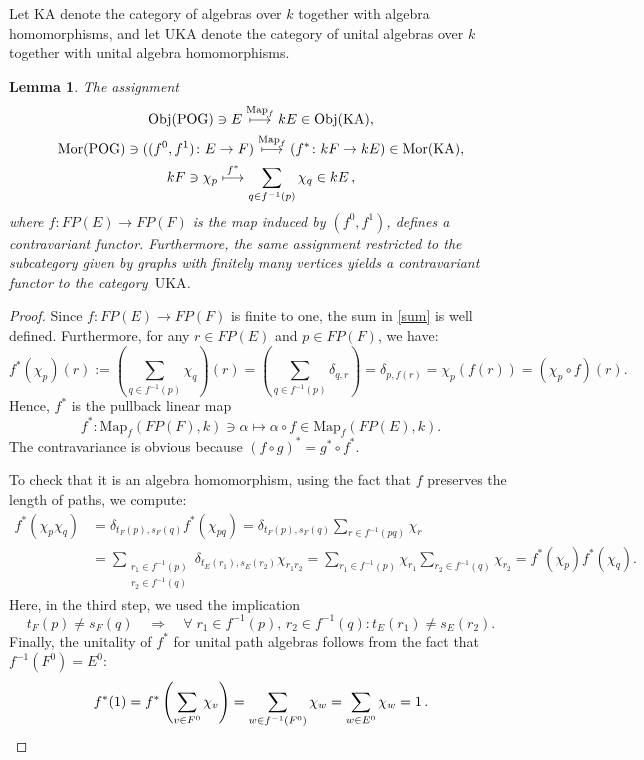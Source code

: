 \documentclass[12pt,times,a4paper]{amsart}
\newtheorem{lemma}[theorem]{Lemma}
\numberwithin{equation}{section}
\numberwithin{equation}{section}
\begin{document}
Let $\mathrm{KA}$ denote the category of algebras over $k$ together with algebra homomorphisms, 
and let $\mathrm{UKA}$ denote the category of unital 
algebras over $k$ together with unital algebra homomorphisms.
\begin{lemma}\label{contrafp}
The assignment
\begin{gather}
\mathrm{Obj}({\rm POG})\ni E\stackrel{\mathrm{Map}_f}{\longmapsto}kE\in\mathrm{Obj}(\mathrm{KA}),\nonumber\\
\mathrm{Mor}({\rm POG})\ni ((f^0,f^1)\colon E\to F)
\stackrel{\mathrm{Map}_f}{\longmapsto}(f^*\colon kF\to kE)\in\mathrm{Mor}(\mathrm{KA}),\nonumber\\
kF\ni \chi_p\stackrel{f^*}{\longmapsto}\sum_{q\in f^{-1}(p)}\chi_q\in kE\,,\label{sum}
\end{gather}
where $f\colon FP(E)\to FP(F)$ is the map induced by $(f^0,f^1)$, defines a contravariant functor. Furthermore, the same assignment 
restricted to the subcategory 
given by graphs with finitely many vertices yields a contravariant functor to the category~$\mathrm{UKA}$.
\end{lemma}
\begin{proof}
Since $f:FP(E)\to FP(F)$ is finite to one, the sum in \eqref{sum} is well defined.
 Furthermore, for any $r\in FP(E)$ and $p\in FP(F)$, we have:
\begin{equation}
f^*(\chi_p)(r):=\left(\sum_{q\in f^{-1}(p)}\chi_q\right) (r)=
\left(\sum_{q\in f^{-1}(p)}\delta_{q,r}\right)=\delta_{p,f(r)}=\chi_p(f(r))=
(\chi_p\circ f)(r).
\end{equation} 
Hence, $f^*$ is the pullback linear map
\begin{equation}
f^*\colon \mathrm{Map}_f(FP(F),k)\ni\alpha\longmapsto\alpha\circ f\in \mathrm{Map}_f(FP(E),k).
\end{equation}
The contravariance  is obvious because
$(f\circ g)^*=g^*\circ f^*$. 

To check that it is an algebra homomorphism, using the fact that $f$ preserves the length of paths,
 we compute:
\begin{align}
f^*(\chi_p\chi_q)&=\delta_{t_F(p),s_F(q)}f^*(\chi_{pq})=\delta_{t_F(p),s_F(q)}\sum_{r\in f^{-1}(pq)}\chi_r
\\
&=\sum_{\substack{r_1\in f^{-1}(p)\\ r_2\in f^{-1}(q)}}\delta_{t_E(r_1),s_E(r_2)}\chi_{r_1r_2}
=\sum_{r_1\in f^{-1}(p)}\chi_{r_1}\sum_{r_2\in f^{-1}(q)}\chi_{r_2}=f^*(\chi_p)f^*(\chi_q). \nonumber
\end{align}
Here, in the third step, we used the implication
\begin{equation}
t_F(p)\neq s_F(q)\quad\Longrightarrow\quad \forall\;r_1\in f^{-1}(p),\, r_2\in f^{-1}(q)\colon t_E(r_1)\neq
s_E(r_2).
\end{equation}
Finally, the unitality of $f^*$ for unital path algebras follows from the fact that $f^{-1}(F^0)=E^0$:
\begin{equation}
f^*(1)=f^*\left(\sum_{v\in F^0}\chi_v\right)=\sum_{w\in f^{-1}(F^0)}\chi_w
=\sum_{w\in E^0}\chi_w=1\,.
\vspace*{-7mm}\end{equation}
\end{proof}
\end{document}
